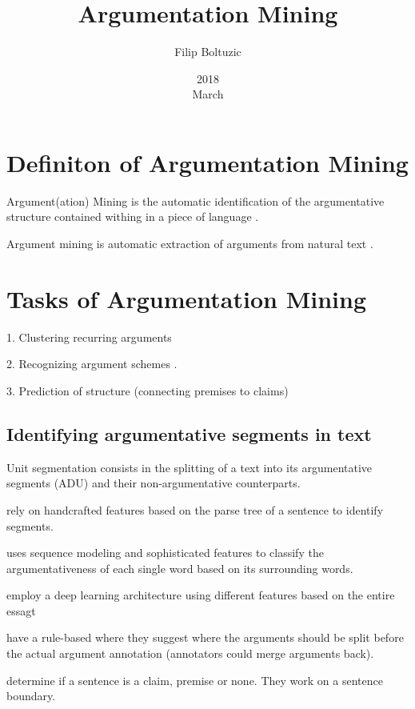 \documentclass[a4paper,10pt]{article}
\title{Argumentation Mining}
\author{Filip Boltuzic}
\date{2018 \\ March}
\begin{document}
\maketitle

\section{Definiton of Argumentation Mining}

Argument(ation) Mining is the automatic identification of the argumentative
structure contained withing in a piece of language \cite{Lawrence2017}.

Argument mining is automatic extraction of arguments from natural text
\cite{Aker2017}.

\section{Tasks of Argumentation Mining}

1. Clustering recurring arguments \cite{boltuvzic2015identifying,
   misra2017using} 
   
2. Recognizing argument schemes \cite{feng2011classifying}. 

3. Prediction of structure (connecting premises to claims) \cite{Aker2017,
   Lawrence2017}

\subsection{Identifying argumentative segments in text}

Unit segmentation consists in the splitting of a text into its
argumentative segments (ADU) and their non-argumentative counterparts.

\cite{Ajjour2017} 

\cite{persing2016end} rely on handcrafted features based on the parse tree
of a sentence to identify segments. 

\cite{stab2017argumentative} uses sequence modeling and sophisticated
features to classify the argumentativeness of each single word based on
its surrounding words. 

\cite{eger2017neural} employ a deep learning architecture using different
features based on the entire essagt

\cite{al2016news} have a rule-based where they suggest where the arguments
should be split before the actual argument annotation (annotators could
merge arguments back).

\cite{Aker2017} determine if a sentence is a claim,
premise or none. They work on a sentence boundary. 
\end{document}
